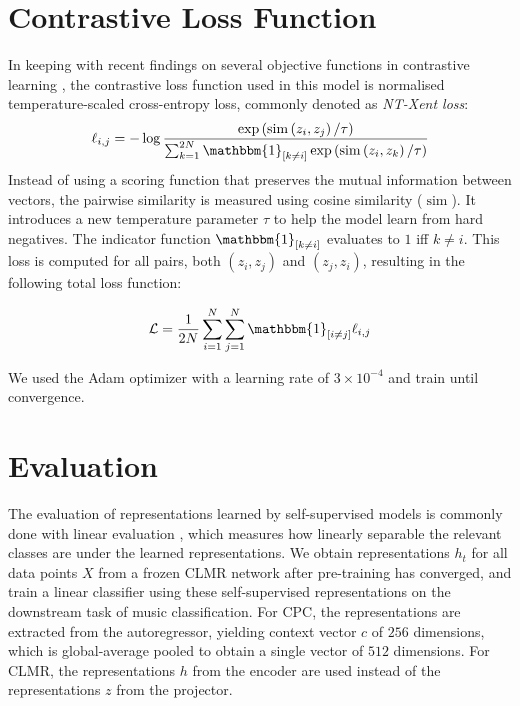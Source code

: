\section{Contrastive Loss Function}
In keeping with recent findings on several objective functions in contrastive learning \cite{chen_simple_2020}, the contrastive loss function used in this model is normalised temperature-scaled cross-entropy loss, commonly denoted as \emph{NT-Xent loss}:
\begin{equation}
    \label{ntxent_loss}
    \ell_{i, j}=-\log \frac{\exp \left(\operatorname{sim}\left(z_{i}, z_{j}\right) / \tau\right)}{\sum_{k=1}^{2 N} \mathbbm{1}_{[k \neq i]} \exp \left(\operatorname{sim}\left(z_{i}, z_{k}\right) / \tau\right)}
\end{equation}
Instead of using a scoring function that preserves the mutual information between vectors, the pairwise similarity is measured using cosine similarity ($\operatorname{sim}$).
It introduces a new temperature parameter $\tau$ to help the model learn from hard negatives. The indicator function $\mathbbm{1}_{[k \neq i]}$ evaluates to $1$ iff $k\neq i$.
This loss is computed for all pairs, both $(z_i, z_j)$ and $(z_j, z_i)$, resulting in the following total loss function:

\begin{equation}
    \label{total_xent_loss}
    \mathcal{L} = \frac{1}{2N}\sum_{i=1}^{N}\sum_{j=1}^{N} \mathbbm{1}_{[i\neq j]}\ell_{i, j}
\end{equation}

We used the Adam optimizer \cite{adam_optimizer} with a learning rate of $3\times10^{-4}$ and train until convergence.


\section{Evaluation}
\label{evaluation}
The evaluation of representations learned by self-supervised models is commonly done with linear evaluation \cite{oord_representation_2019,hjelm_learning_2019,chen_simple_2020}, which measures how linearly separable the relevant classes are under the learned representations. We obtain representations $h_t$ for all data points $X$ from a frozen CLMR network after pre-training has converged, and train a linear classifier using these self-supervised representations on the downstream task of music classification. For CPC, the representations are extracted from the autoregressor, yielding context vector $c$ of $256$ dimensions, which is global-average pooled to obtain a single vector of $512$ dimensions. For CLMR, the representations $h$ from the encoder are used instead of the representations $z$ from the projector.


